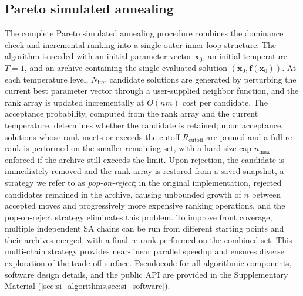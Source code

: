 \documentclass[preprint,review,12pt]{elsarticle}
\begin{document}
\subsection{Pareto simulated annealing}\label{sec:annealing}
The complete Pareto simulated annealing procedure combines the dominance check and incremental ranking into a single outer-inner loop structure.
The algorithm is seeded with an initial parameter vector $\mathbf{x}_0$, an initial temperature $T = 1$, and an archive containing the single evaluated solution $(\mathbf{x}_0, \mathbf{f}(\mathbf{x}_0))$.
At each temperature level, $N_{\text{iter}}$ candidate solutions are generated by perturbing the current best parameter vector through a user-supplied neighbor function, and the rank array is updated incrementally at $O(nm)$ cost per candidate.
The acceptance probability, computed from the rank array and the current temperature, determines whether the candidate is retained; upon acceptance, solutions whose rank meets or exceeds the cutoff $R_{\text{cutoff}}$ are pruned and a full re-rank is performed on the smaller remaining set, with a hard size cap $n_{\max}$ enforced if the archive still exceeds the limit.
Upon rejection, the candidate is immediately removed and the rank array is restored from a saved snapshot, a strategy we refer to as \emph{pop-on-reject}; in the original implementation, rejected candidates remained in the archive, causing unbounded growth of $n$ between accepted moves and progressively more expensive ranking operations, and the pop-on-reject strategy eliminates this problem.
To improve front coverage, multiple independent SA chains can be run from different starting points and their archives merged, with a final re-rank performed on the combined set.
This multi-chain strategy provides near-linear parallel speedup and ensures diverse exploration of the trade-off surface.
Pseudocode for all algorithmic components, software design details, and the public API are provided in the Supplementary Material (\cref{sec:si_algorithms,sec:si_software}).

\end{document}
